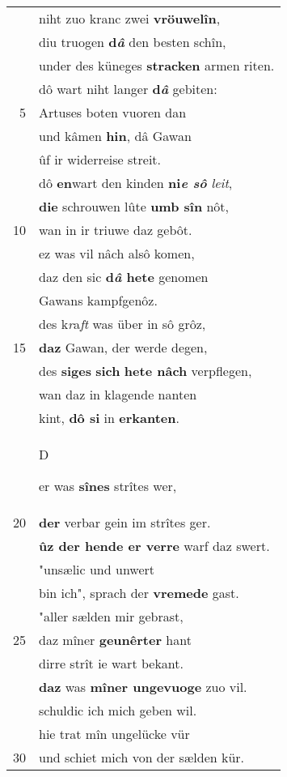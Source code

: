 \documentclass[8pt,a4paper,notitlepage]{article}
\begin{document}
\begin{table}[ht]
\begin{minipage}[t]{0.5\linewidth}
\begin{tabular}{rl}
 & niht zuo kranc zwei \textbf{vröuwelîn},\\ 
 & diu truogen \textbf{d\textit{â}} den besten schîn,\\ 
 & under des küneges \textbf{stracken} armen riten.\\ 
 & dô wart niht langer \textbf{d\textit{â}} gebiten:\\ 
5 & Artuses boten vuoren dan\\ 
 & und kâmen \textbf{hin}, dâ Gawan\\ 
 & ûf ir widerreise streit.\\ 
 & dô \textbf{en}wart den kinden \textbf{ni\textit{e sô}} \textit{leit},\\ 
 & \textbf{die} schrouwen lûte \textbf{umb sîn} nôt,\\ 
10 & wan in ir triuwe daz gebôt.\\ 
 & ez was vil nâch alsô komen,\\ 
 & daz den sic \textbf{d\textit{â} hete} genomen\\ 
 & Gawans kampfgenôz.\\ 
 & des k\textit{r}a\textit{ft} was über in sô grôz,\\ 
15 & \textbf{daz} Gawan, der werde degen,\\ 
 & des \textbf{siges} \textbf{sich} \textbf{hete nâch} verpflegen,\\ 
 & wan daz in klagende nanten\\ 
 & kint, \textbf{dô si} in \textbf{erkanten}.\\ 
 & \begin{large}D\end{large}er was \textbf{sînes} strîtes wer,\\ 
20 & \textbf{der} verbar gein im strîtes ger.\\ 
 & \textbf{ûz der hende er verre} warf daz swert.\\ 
 & "unsælic und unwert\\ 
 & bin ich", sprach der \textbf{vremede} gast.\\ 
 & "aller sælden mir gebrast,\\ 
25 & daz mîner \textbf{geunêrter} hant\\ 
 & dirre strît ie wart bekant.\\ 
 & \textbf{daz} was \textbf{mîner ungevuoge} zuo vil.\\ 
 & schuldic ich mich geben wil.\\ 
 & hie trat mîn ungelücke vür\\ 
30 & und schiet mich von der sælden kür.\\ 

\end{tabular}
\end{minipage}
\end{table}
\end{document}
